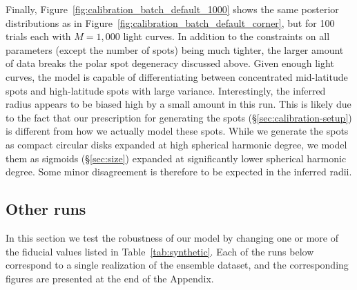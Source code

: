 \documentclass[modern]{aastex62}
\begin{document}
Finally, Figure~\ref{fig:calibration_batch_default_1000} shows
the same posterior distributions as in Figure~\ref{fig:calibration_batch_default_corner},
but for 100 trials each with $M=1{,}000$ light curves. In addition to the
constraints on all parameters (except the number of spots) being much
tighter, the larger amount of data breaks the polar spot degeneracy discussed
above. Given enough light curves, the model is capable of differentiating between
concentrated mid-latitude spots and high-latitude spots with large variance.
Interestingly, the inferred radius appears to be biased high by a small amount
in this run. This is likely due to the fact that our prescription for
generating the spots (\S\ref{sec:calibration-setup}) is different from how
we actually model these spots. While we generate the spots as compact
circular disks expanded at high spherical harmonic degree, we model them
as sigmoids (\S\ref{sec:size}) expanded at significantly lower spherical
harmonic degree. Some minor disagreement is therefore to be expected in the inferred
radii.

\subsection{Other runs}
In this section we test the robustness of our model by changing one or
more of the fiducial values listed in Table~\ref{tab:synthetic}.
Each of the runs below correspond to a single realization of the ensemble
dataset, and the corresponding figures are presented at the end of the Appendix.
\end{document}
